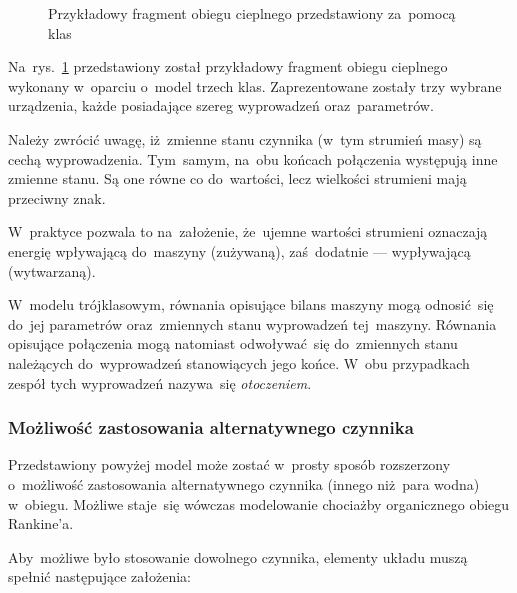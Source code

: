 \begin{figure}[h]

	\caption{Przykładowy fragment obiegu cieplnego przedstawiony
		za~pomocą klas}
	\label{klasy-przykl}
\end{figure}

Na~rys.~\ref{klasy-przykl} przedstawiony został przykładowy fragment
obiegu cieplnego wykonany w~oparciu o~model trzech klas. Zaprezentowane
zostały trzy wybrane urządzenia, każde posiadające szereg wyprowadzeń
oraz~parametrów.

Należy zwrócić uwagę, iż~zmienne stanu czynnika (w~tym strumień masy) są
cechą wyprowadzenia. Tym~samym, na~obu końcach połączenia występują inne
zmienne stanu. Są one równe co do~wartości, lecz wielkości strumieni
mają przeciwny znak.

W~praktyce pozwala to na~założenie, że~ujemne wartości strumieni
oznaczają energię wpływającą do~maszyny (zużywaną), zaś~dodatnie ---
wypływającą (wytwarzaną).

W~modelu trójklasowym, równania opisujące bilans maszyny mogą
odnosić~się do~jej parametrów oraz~zmiennych stanu wyprowadzeń
tej~maszyny. Równania opisujące połączenia mogą natomiast odwoływać~się
do~zmiennych stanu należących do~wyprowadzeń stanowiących jego końce.
W~obu przypadkach zespół tych wyprowadzeń nazywa~się
\textit{otoczeniem}.


\subsubsection{Możliwość zastosowania alternatywnego czynnika}

Przedstawiony powyżej model może zostać w~prosty sposób rozszerzony
o~możliwość zastosowania alternatywnego czynnika (innego niż~para wodna)
w~obiegu. Możliwe staje~się wówczas modelowanie chociażby organicznego
obiegu Rankine'a.

Aby~możliwe było stosowanie dowolnego czynnika, elementy układu muszą
spełnić następujące założenia:

